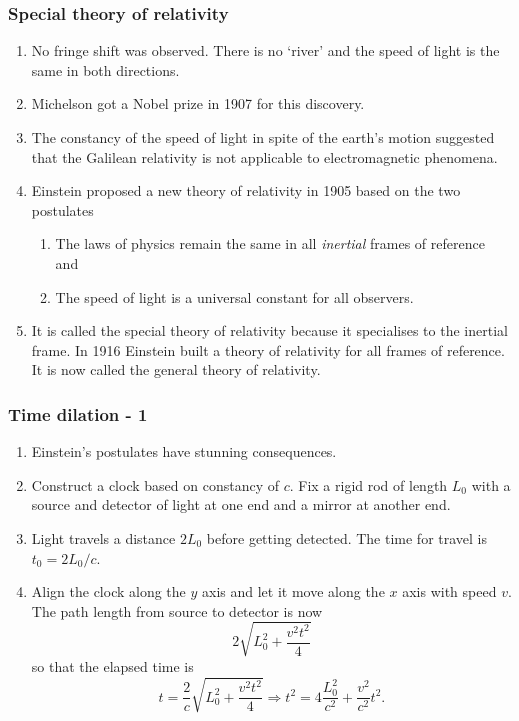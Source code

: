 \documentclass{beamer}
\begin{document}
\begin{frame}
\frametitle{Special theory of relativity}
\begin{enumerate}
\item No fringe shift was observed. There is no `river' and the speed of light
is the same in both directions.
\item Michelson got a Nobel prize in 1907 for this discovery.
\item The constancy of the speed of light in spite of the earth's motion 
suggested that the Galilean relativity is not applicable to electromagnetic 
phenomena.
\item Einstein proposed a new theory of relativity in 1905 based on the two 
postulates
\begin{enumerate}
\item The laws of physics remain the same in all \emph{inertial} frames of
reference and
\item The speed of light is a universal constant for all observers.
\end{enumerate}
\item It is called the special theory of relativity because it specialises to
the inertial frame. In 1916 Einstein built a theory of relativity for all
frames of reference. It is now called the general theory of relativity.
\end{enumerate}
\end{frame}

\begin{frame}
\frametitle{Time dilation - 1}
\begin{enumerate}
\item Einstein's postulates have stunning consequences.
\item Construct a clock based on constancy of $c$. Fix a rigid rod of length
$L_0$ with a source and detector of light at one end and a mirror at another 
end.
\item Light travels a distance $2L_0$ before getting detected. The time for 
travel is $t_0 = 2L_0/c$.
\item Align the clock along the $y$ axis and let it move along the $x$ axis
with speed $v$. The path length from source to detector is now
\[
2\sqrt{L_0^2 + \frac{v^2t^2}{4}}
\]
so that the elapsed time is
\begin{equation}\label{e6}
t = \frac{2}{c}\sqrt{L_0^2 + \frac{v^2t^2}{4}} \Rightarrow 
t^2 = 4\frac{L_0^2}{c^2} + \frac{v^2}{c^2}t^2.
\end{equation}
\end{enumerate}
\end{frame}
\end{document}

